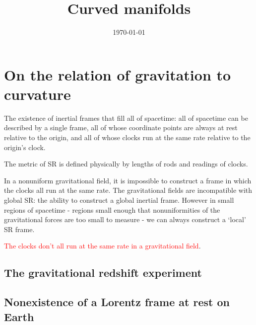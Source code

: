 \documentclass[12pt,a4paper]{article}
\title{Curved manifolds}
\author{}
\date{\today}
\begin{document}
\maketitle
\section{On the relation of gravitation to curvature}
The existence of inertial frames that fill all of spacetime: all of spacetime can be described by a single frame, all of whose coordinate points are always at rest relative to the origin, and all of whose clocks run at the same rate relative to the origin’s clock.

The metric of SR is defined physically by lengths of rods and readings of clocks. 

In a nonuniform gravitational field, it is impossible to construct a frame in which the clocks all run at the same rate. The gravitational fields are incompatible with global SR: the ability to construct a global inertial frame. However in small regions of spacetime - regions small enough that nonuniformities of the gravitational forces are too small to measure - we can always construct a `local' SR frame. 

\textcolor{red}{The clocks don't all run at the same rate in a gravitational field}.



\subsection{The gravitational redshift experiment}





















\subsection{Nonexistence of a Lorentz frame at rest on Earth}
\end{document}
